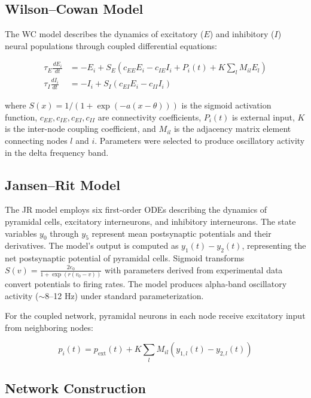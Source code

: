 \documentclass[11pt]{article}
\begin{document}
\subsection{Wilson--Cowan Model}

The WC model describes the dynamics of excitatory ($E$) and inhibitory ($I$) neural populations through coupled differential equations:

\begin{align}
\tau_E \frac{dE_i}{dt} &= -E_i + S_E\left(c_{EE} E_i - c_{IE} I_i + P_i(t) + K \sum_{l} M_{il} E_l\right) \\
\tau_I \frac{dI_i}{dt} &= -I_i + S_I\left(c_{EI} E_i - c_{II} I_i\right)
\end{align}

\noindent where $S(x) = 1/(1 + \exp(-a(x - \theta)))$ is the sigmoid activation function, $c_{EE}, c_{IE}, c_{EI}, c_{II}$ are connectivity coefficients, $P_i(t)$ is external input, $K$ is the inter-node coupling coefficient, and $M_{il}$ is the adjacency matrix element connecting nodes $l$ and $i$. Parameters were selected to produce oscillatory activity in the delta frequency band.

\subsection{Jansen--Rit Model}

The JR model employs six first-order ODEs describing the dynamics of pyramidal cells, excitatory interneurons, and inhibitory interneurons. The state variables $y_0$ through $y_5$ represent mean postsynaptic potentials and their derivatives. The model's output is computed as $y_1(t) - y_2(t)$, representing the net postsynaptic potential of pyramidal cells. Sigmoid transforms $S(v) = \frac{2e_0}{1 + \exp(r(v_0 - v))}$ with parameters derived from experimental data convert potentials to firing rates. The model produces alpha-band oscillatory activity ($\sim$8--12 Hz) under standard parameterization.

For the coupled network, pyramidal neurons in each node receive excitatory input from neighboring nodes:

\begin{equation}
p_i(t) = p_{\text{ext}}(t) + K \sum_{l} M_{il} \left(y_{1,l}(t) - y_{2,l}(t)\right)
\end{equation}

\subsection{Network Construction}
\end{document}
